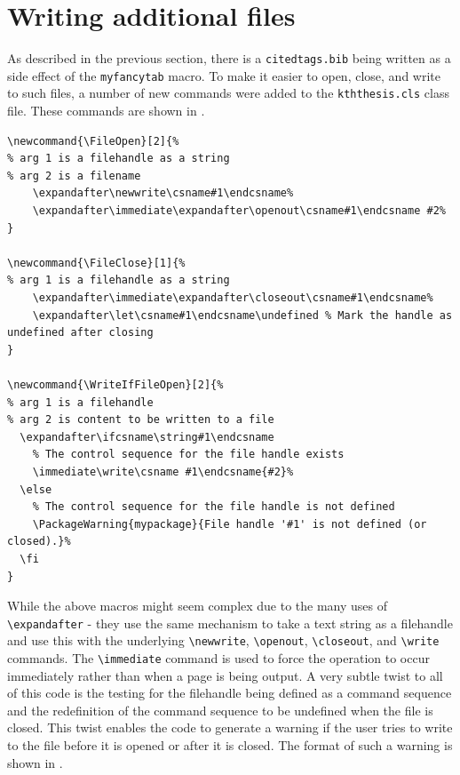 \documentclass[12pt, twoside]{article}
\begin{document}
\section{Writing additional files}
\label{sec:cycle3WritingFiles}

As described in the previous section, there is a \texttt{citedtags.bib} being written as a side effect of the \texttt{myfancytab} macro. To make it easier to open, close, and write to such files, a number of new commands were added to the \texttt{kththesis.cls} class file. These commands are shown in .

\begin{lstlisting}[style=latexExampleForAuthors, caption={File I/O macros}, label=lst:fileIOmacros]
% Define some functions to make it easier to open, close, and write to the file if it is open, while generating errors if the file is not open
\newcommand{\FileOpen}[2]{%
% arg 1 is a filehandle as a string
% arg 2 is a filename
    \expandafter\newwrite\csname#1\endcsname%
    \expandafter\immediate\expandafter\openout\csname#1\endcsname #2%
}

\newcommand{\FileClose}[1]{%
% arg 1 is a filehandle as a string
    \expandafter\immediate\expandafter\closeout\csname#1\endcsname%
    \expandafter\let\csname#1\endcsname\undefined % Mark the handle as undefined after closing
}

\newcommand{\WriteIfFileOpen}[2]{%
% arg 1 is a filehandle
% arg 2 is content to be written to a file
  \expandafter\ifcsname\string#1\endcsname
    % The control sequence for the file handle exists
    \immediate\write\csname #1\endcsname{#2}%
  \else
    % The control sequence for the file handle is not defined
    \PackageWarning{mypackage}{File handle '#1' is not defined (or closed).}%
  \fi
}
\end{lstlisting}

While the above macros might seem complex due to the many uses of \texttt{\textbackslash expandafter} - they use the same mechanism to take a text string as a filehandle and use this with the underlying \texttt{\textbackslash newwrite}, \texttt{\textbackslash openout},  \texttt{\textbackslash closeout}, and \texttt{\textbackslash write} commands. The \texttt{\textbackslash immediate} command is used to force the operation to occur immediately rather than when a page is being output. A very subtle twist to all of this code is the testing for the filehandle being defined as a command sequence and the redefinition of the command sequence to be undefined when the file is closed. This twist enables the code to generate a warning if the user tries to write to the file before it is opened or after it is closed. The format of such a warning is shown in .
\end{document}
